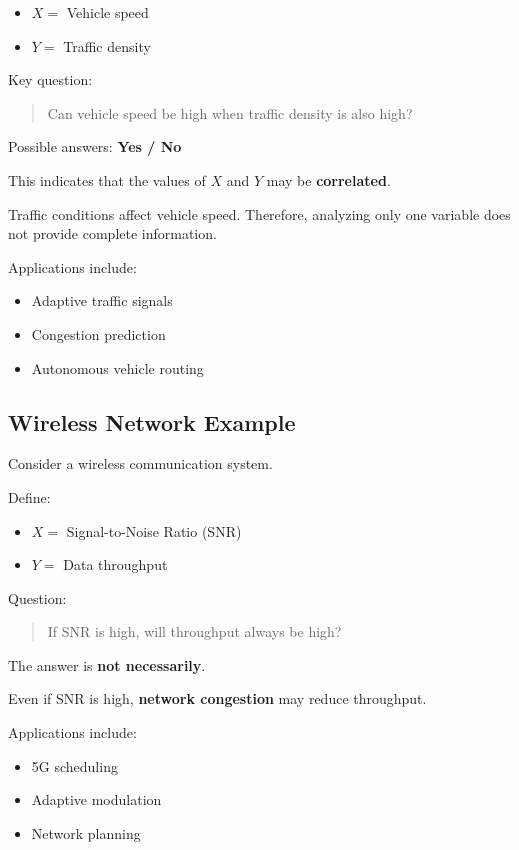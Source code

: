 \documentclass[12pt]{article}
\begin{document}
\begin{itemize}
\item $X =$ Vehicle speed
\item $Y =$ Traffic density
\end{itemize}

Key question:

\begin{quote}
Can vehicle speed be high when traffic density is also high?
\end{quote}

Possible answers: \textbf{Yes / No}

This indicates that the values of $X$ and $Y$ may be \textbf{correlated}.

Traffic conditions affect vehicle speed. Therefore, analyzing only one variable does not provide complete information.

Applications include:

\begin{itemize}
\item Adaptive traffic signals
\item Congestion prediction
\item Autonomous vehicle routing
\end{itemize}

\subsection{Wireless Network Example}

Consider a wireless communication system.

Define:

\begin{itemize}
\item $X =$ Signal-to-Noise Ratio (SNR)
\item $Y =$ Data throughput
\end{itemize}

Question:

\begin{quote}
If SNR is high, will throughput always be high?
\end{quote}

The answer is \textbf{not necessarily}.

Even if SNR is high, \textbf{network congestion} may reduce throughput.

Applications include:

\begin{itemize}
\item 5G scheduling
\item Adaptive modulation
\item Network planning
\end{itemize}
\end{document}
